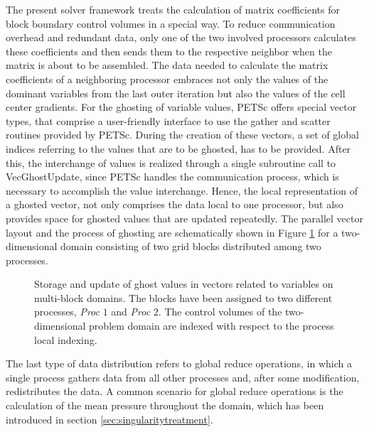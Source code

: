 The present solver framework treats the calculation of matrix coefficients for block boundary control volumes in a special way. To reduce communication overhead and redundant data, only one of the two involved processors calculates these coefficients and then sends them to the respective neighbor when the matrix is about to be assembled. The data needed to calculate the matrix coefficients of a neighboring processor embraces not only the values of the dominant variables from the last outer iteration but also the values of the cell center gradients. For the ghosting of variable values, PETSc offers special vector types, that comprise a user-friendly interface to use the gather and scatter routines provided by PETSc. During the creation of these vectors, a set of global indices referring to the values that are to be ghosted, has to be provided. After this, the interchange of values is realized through a single subroutine call to \textrm{VecGhostUpdate}, since PETSc handles the communication process, which is necessary to accomplish the value interchange. Hence, the local representation of a ghosted vector, not only comprises the data local to one processor, but also provides space for ghosted values that are updated repeatedly. The parallel vector layout and the process of ghosting are schematically shown in Figure \ref{fig:ghosting} for a two-dimensional domain consisting of two grid blocks distributed among two processes.

\begin{figure}[h!]
  \centering
  \label{fig:segassemble}
  
  \caption{Storage and update of ghost values in vectors related to variables on multi-block domains. The blocks have been assigned to two different processes, \emph{Proc} $1$ and \emph{Proc} $2$. The control volumes of the two-dimensional problem domain are indexed with respect to the process local indexing.}
  \label{fig:ghosting}
\end{figure}

The last type of data distribution refers to global reduce operations, in which a single process gathers data from all other processes and, after some modification, redistributes the data. A common scenario for global reduce operations is the calculation of the mean pressure throughout the domain, which has been introduced in section \ref{sec:singularitytreatment}.


